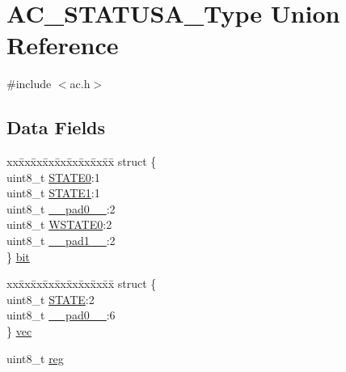 \hypertarget{union_a_c___s_t_a_t_u_s_a___type}{}\section{A\+C\+\_\+\+S\+T\+A\+T\+U\+S\+A\+\_\+\+Type Union Reference}
\label{union_a_c___s_t_a_t_u_s_a___type}


{\ttfamily \#include $<$ac.\+h$>$}

\subsection*{Data Fields}
\begin{DoxyCompactItemize}
\item 
\begin{tabbing}
xx\=xx\=xx\=xx\=xx\=xx\=xx\=xx\=xx\=\kill
struct \{\\
\>uint8\_t \mbox{\hyperlink{union_a_c___s_t_a_t_u_s_a___type_a88b590631c8b51e4652834989115088d}{STATE0}}:1\\
\>uint8\_t \mbox{\hyperlink{union_a_c___s_t_a_t_u_s_a___type_afb27ce50eca91592253cc05f0120c932}{STATE1}}:1\\
\>uint8\_t \mbox{\hyperlink{union_a_c___s_t_a_t_u_s_a___type_a8b4eebe79ded0459acec2f4950102ba3}{\_\_pad0\_\_}}:2\\
\>uint8\_t \mbox{\hyperlink{union_a_c___s_t_a_t_u_s_a___type_aa7cf9eb386cc7454040a563168ba79a3}{WSTATE0}}:2\\
\>uint8\_t \mbox{\hyperlink{union_a_c___s_t_a_t_u_s_a___type_a77f12d2e278bd5c07712648ac0df5e08}{\_\_pad1\_\_}}:2\\
\} \mbox{\hyperlink{union_a_c___s_t_a_t_u_s_a___type_a1be86dd09dd9831a737260dc3864d2a9}{bit}}\\

\end{tabbing}\item 
\begin{tabbing}
xx\=xx\=xx\=xx\=xx\=xx\=xx\=xx\=xx\=\kill
struct \{\\
\>uint8\_t \mbox{\hyperlink{union_a_c___s_t_a_t_u_s_a___type_a0ee5c1482a272080958f6eb898bc0358}{STATE}}:2\\
\>uint8\_t \mbox{\hyperlink{union_a_c___s_t_a_t_u_s_a___type_a8b4eebe79ded0459acec2f4950102ba3}{\_\_pad0\_\_}}:6\\
\} \mbox{\hyperlink{union_a_c___s_t_a_t_u_s_a___type_a0b5d34b5500f613dd3babf114bbffef6}{vec}}\\

\end{tabbing}\item 
uint8\+\_\+t \mbox{\hyperlink{union_a_c___s_t_a_t_u_s_a___type_a9428adc9af4653a2050e2536b55dec8d}{reg}}
\end{DoxyCompactItemize}


